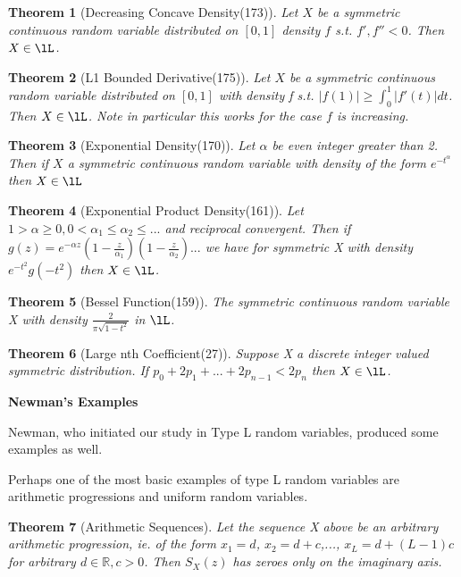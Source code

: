 \documentclass[10pt]{article}
\newcommand{\1}{\textbf{1}}
\newcommand{\R}{\mathbb{R}}
\newtheorem{theorem}{Theorem}
\theoremstyle{remark}
\theoremstyle{definition}
\begin{document}
\begin{theorem}[Decreasing Concave Density(173)] 
	Let $X$ be a symmetric continuous random variable distributed on $[0,1]$ density $f$ s.t. $f',f'' < 0$. Then $X \in \lL$.
\end{theorem}

\begin{theorem}[L1 Bounded Derivative(175)] 
	Let $X$ be a symmetric continuous random variable distributed on $[0,1]$ with density f s.t. $|f(1)| \geq \int_0^1 |f'(t)|dt$. Then $X \in \lL$. Note in particular this works for the case $f$ is increasing.
\end{theorem}

\begin{theorem}[Exponential Density(170)] 
	Let $\alpha$ be even integer greater than 2. Then if $X$ a symmetric continuous random variable with density of the form $e^{-t^{\alpha}}$ then $X \in \lL$
\end{theorem}

\begin{theorem}[Exponential Product Density(161)]
	Let $1 > \alpha \geq 0, 0 < \alpha_1 \leq \alpha_2 \leq ...$ and reciprocal convergent. Then if $g(z)= e^{-\alpha z} (1-\frac{z}{\alpha_1})(1-\frac{z}{\alpha_2})...$ we have for symmetric X with density $e^{-t^2} g(-t^2)$ then $X \in \lL$.
\end{theorem}

\begin{theorem}[Bessel Function(159)] 
	The symmetric continuous random variable X with density $\frac{2}{\pi\sqrt{1-t^2}}$ in $\lL$.
\end{theorem} 

\begin{theorem}[Large nth Coefficient(27)] 
	Suppose X a discrete integer valued symmetric distribution. If $p_0 + 2p_1 +... + 2p_{n-1} < 2p_n$ then $X \in \lL$. 
\end{theorem}


\textbf{Newman's Examples}

Newman, who initiated our study in Type L random variables, produced some examples as well. 

Perhaps one of the most basic examples of type L random variables are arithmetic progressions and uniform random variables.

\begin{theorem}[Arithmetic Sequences] 
	Let the sequence X above be an arbitrary arithmetic progression, ie. of the form $x_1 = d$, $x_2 = d+c$,..., $x_L = d + (L-1)c$ for arbitrary $d \in \R, c > 0$. Then $S_X(z)$ has zeroes only on the imaginary axis.
\end{theorem}
\end{document}
